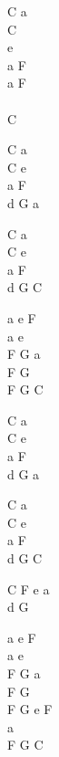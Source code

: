 \begin{chord}
    C a\\
    C\\
    e\\
    a F\\
    a F\\
    \\
    C

    C a\\
    C e\\
    a F\\
    d G a

    C a\\
    C e\\
    a F\\
    d G C

    a e F\\
    a e\\
    F G a\\
    F G\\
    F G C

    C a\\
    C e\\
    a F\\
    d G a

    C a\\
    C e\\
    a F\\
    d G C

    C F e a\\
    d G

    a e F\\
    a e\\
    F G a\\
    F G\\
    F G e F\\
    a\\
	F G C
\end{chord}